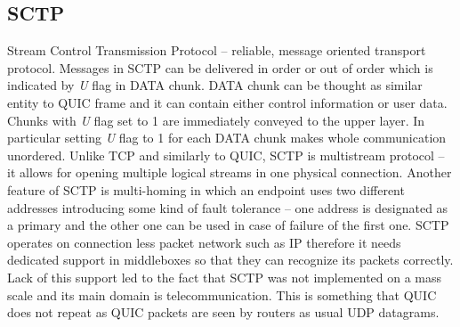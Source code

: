 \subsection{SCTP}
\label{subsec:sctp}
Stream Control Transmission Protocol -- reliable, message oriented transport protocol.
Messages in SCTP can be delivered in order or out of order which is indicated by \textit{U} flag in DATA chunk.
DATA chunk can be thought as similar entity to QUIC frame and it can contain either control information or user data.
Chunks with \textit{U} flag set to 1 are immediately conveyed to the upper layer.
In particular setting \textit{U} flag to 1 for each DATA chunk makes whole communication unordered.
Unlike TCP and similarly to QUIC, SCTP is multistream protocol -- it allows for opening multiple logical streams in one physical connection.
Another feature of SCTP is multi-homing in which an endpoint uses two different addresses introducing some kind of fault tolerance --
one address is designated as a primary and the other one can be used in case of failure of the first one.
SCTP operates on connection less packet network such as IP therefore it needs dedicated support in middleboxes so that they can
recognize its packets correctly.
Lack of this support led to the fact that SCTP was not implemented on a mass scale and its main domain is telecommunication.
This is something that QUIC does not repeat as QUIC packets are seen by routers as usual UDP datagrams.

